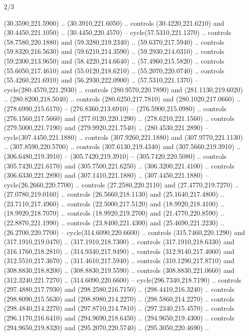 \begin{flagdescription}{2/3}
\begin{scope}[xshift=0.5\flaglength,yshift=0.5\flagwidth,scale=\stretchfactor]
\begin{scope}[scale=0.001645\flagwidth,yshift=65mm,xshift=-63mm]
\begin{scope}[y=0.80pt, x=0.80pt, yscale=-1,]
\begin{scope}[cm={{1.33333,0.0,0.0,1.33333,(0.0,1e-05)}}]
  (30.3590,221.5900) .. (30.3910,221.6050) .. controls (30.4220,221.6210) and
  (30.4450,221.1050) .. (30.4450,220.4570) -- cycle(57.5310,221.1370) ..
  controls (58.7580,220.1880) and (59.3280,219.2340) .. (59.6370,217.5940) ..
  controls (59.8320,216.5630) and (59.6210,214.3590) .. (59.2930,214.0310) ..
  controls (59.2300,213.9650) and (58.4220,214.6640) .. (57.4960,215.5820) ..
  controls (55.6050,217.4610) and (55.0120,218.6210) .. (55.2070,220.0740) ..
  controls (55.4260,221.6910) and (56.2930,222.0900) .. (57.5310,221.1370) --
  cycle(280.4570,221.2930) .. controls (280.9570,220.7890) and
  (281.1130,219.6020) .. (280.8200,218.5040) .. controls (280.6250,217.7810) and
  (280.1020,217.0660) .. (278.6990,215.6170) -- (276.8360,213.6910) --
  (276.5900,215.0980) .. controls (276.1560,217.5660) and (277.0120,220.1290) ..
  (278.6210,221.1560) .. controls (279.5000,221.7190) and (279.9920,221.7540) ..
  (280.4530,221.2890) -- cycle(307.4450,221.1880) .. controls
  (307.9260,221.1880) and (307.9770,221.1130) .. (307.8590,220.5700) .. controls
  (307.6130,219.4340) and (307.5660,219.3910) .. (306.6480,219.3910) --
  (305.7420,219.3910) -- (305.7420,220.5080) .. controls (305.7420,221.6170) and
  (305.7500,221.6250) .. (306.3200,221.4100) .. controls (306.6330,221.2890) and
  (307.1410,221.1880) .. (307.4450,221.1880) -- cycle(26.2660,220.7700) ..
  controls (27.2580,220.2110) and (27.4770,219.7270) .. (27.0780,219.0160) ..
  controls (26.5660,218.1130) and (25.1640,217.4800) .. (23.7110,217.4960) ..
  controls (22.5000,217.5120) and (18.9920,218.4100) .. (18.9920,218.7070) ..
  controls (18.9920,219.2700) and (21.4770,220.8590) .. (22.8870,221.1990) ..
  controls (23.8400,221.4300) and (25.4690,221.2230) .. (26.2700,220.7700) --
  cycle(314.6090,220.6600) .. controls (315.7460,220.1290) and
  (317.1910,219.0470) .. (317.1910,218.7300) .. controls (317.1910,218.6330) and
  (316.1760,218.2810) .. (314.9340,217.9490) .. controls (312.9140,217.4060) and
  (312.5510,217.3670) .. (311.4610,217.5940) .. controls (310.1290,217.8710) and
  (308.8830,218.8200) .. (308.8830,219.5590) .. controls (308.8830,221.0660) and
  (312.3240,221.7270) .. (314.6090,220.6600) -- cycle(296.7340,218.7190) ..
  controls (297.4880,217.7930) and (298.2580,216.7150) .. (298.4410,216.3240) ..
  controls (298.8090,215.5630) and (298.8980,214.2270) .. (298.5860,214.2270) ..
  controls (298.4840,214.2270) and (297.8710,214.7810) .. (297.2340,215.4570) ..
  controls (296.1170,216.6410) and (294.9690,218.6450) .. (294.9650,219.4300) ..
  controls (294.9650,219.8320) and (295.2070,220.5740) .. (295.3050,220.4690) ..

\end{scope}
\end{scope}
\end{scope}
\end{scope}
\end{flagdescription}
